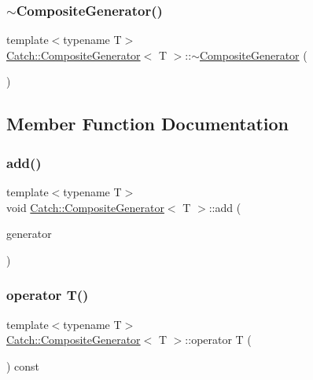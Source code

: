\subsubsection{\texorpdfstring{$\sim$\+Composite\+Generator()}{~CompositeGenerator()}}
{\footnotesize\ttfamily template$<$typename T$>$ \\
\hyperlink{class_catch_1_1_composite_generator}{Catch\+::\+Composite\+Generator}$<$ T $>$\+::$\sim$\hyperlink{class_catch_1_1_composite_generator}{Composite\+Generator} (\begin{DoxyParamCaption}{ }\end{DoxyParamCaption})\hspace{0.3cm}{\ttfamily [inline]}}



\subsection{Member Function Documentation}
\mbox{\label{class_catch_1_1_composite_generator_af3774d42ad2d3453d089ca599efe0517}} 
\subsubsection{\texorpdfstring{add()}{add()}}
{\footnotesize\ttfamily template$<$typename T$>$ \\
void \hyperlink{class_catch_1_1_composite_generator}{Catch\+::\+Composite\+Generator}$<$ T $>$\+::add (\begin{DoxyParamCaption}\item[{const \hyperlink{struct_catch_1_1_i_generator}{I\+Generator}$<$ T $>$ $\ast$}]{generator }\end{DoxyParamCaption})\hspace{0.3cm}{\ttfamily [inline]}}

\mbox{\label{class_catch_1_1_composite_generator_a83d6c941e2e735b9528e6e832f7b76e7}} 
\subsubsection{\texorpdfstring{operator T()}{operator T()}}
{\footnotesize\ttfamily template$<$typename T$>$ \\
\hyperlink{class_catch_1_1_composite_generator}{Catch\+::\+Composite\+Generator}$<$ T $>$\+::operator T (\begin{DoxyParamCaption}{ }\end{DoxyParamCaption}) const\hspace{0.3cm}{\ttfamily [inline]}}

